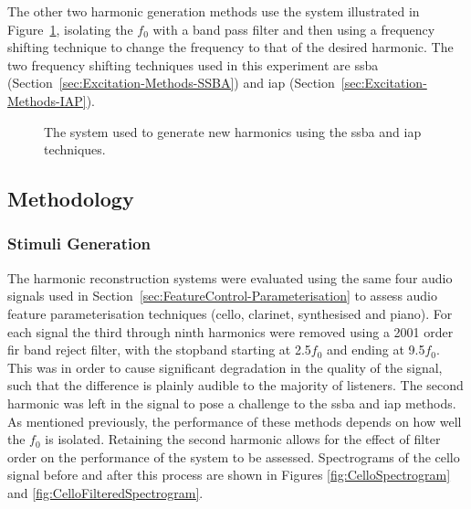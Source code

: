 		The other two harmonic generation methods use the system illustrated in Figure~\ref{fig:FilterAndShift},
		isolating the $f_{0}$ with a band pass filter and then using a frequency shifting technique to change the
		frequency to that of the desired harmonic. The two frequency shifting techniques used in this experiment
		are \acrshort{ssba} (Section~\ref{sec:Excitation-Methods-SSBA}) and \acrshort{iap}
		(Section~\ref{sec:Excitation-Methods-IAP}).

		\begin{figure}[h!]
			\centering
			\caption{The system used to generate new harmonics using the \acrshort{ssba} and \acrshort{iap}
				 techniques.}
			\label{fig:FilterAndShift}
		\end{figure}

	\subsection{Methodology}
	\label{sec:PerceptualExperiments-Reconstruction-Methodology}
		\subsubsection*{Stimuli Generation}
			The harmonic reconstruction systems were evaluated using the same four audio signals used in
			Section~\ref{sec:FeatureControl-Parameterisation} to assess audio feature parameterisation
			techniques (cello, clarinet, synthesised and piano). For each signal the third through ninth
			harmonics were removed using a 2001 order \acrshort{fir} band reject filter, with the
			stopband starting at 2.5$f_{0}$ and ending at 9.5$f_{0}$. This was in order to cause significant
			degradation in the quality of the signal, such that the difference is plainly audible to the
			majority of listeners. The second harmonic was left in the signal to pose a challenge to the
			\acrshort{ssba} and \acrshort{iap} methods. As mentioned previously, the performance of these
			methods depends on how well the $f_{0}$ is isolated.  Retaining the second harmonic allows for the
			effect of filter order on the performance of the system to be assessed. Spectrograms of the cello
			signal before and after this process are shown in Figures \ref{fig:CelloSpectrogram} and
			\ref{fig:CelloFilteredSpectrogram}. 

